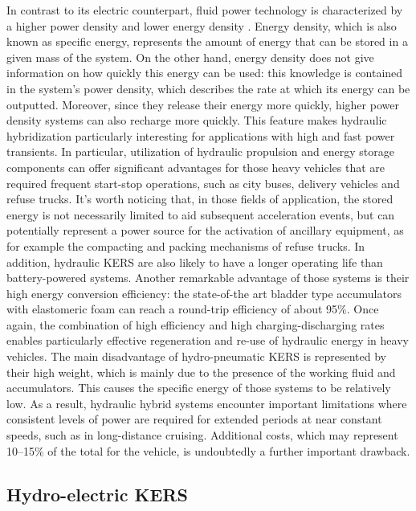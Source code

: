 \documentclass[11pt]{article}
\begin{document}
In contrast to its electric counterpart, fluid power technology is characterized by a higher power density and lower energy density \cite{f}. Energy density, which is also known as specific energy, represents the amount of energy that can be stored in a given mass of the system. On the other hand, energy density does not give information on how quickly this energy can be used: this knowledge is contained in the system's power density, which describes the rate at which its energy can be outputted. Moreover, since they release their energy more quickly, higher power density systems can also recharge more quickly. This feature makes hydraulic hybridization particularly interesting for applications with high and fast power transients.  In particular, utilization of hydraulic propulsion and energy storage components can offer significant advantages for those heavy vehicles that are required frequent start-stop operations, such as city buses, delivery vehicles and refuse trucks. It’s worth noticing that, in those fields of application, the stored energy is not necessarily limited to aid subsequent acceleration events, but can potentially represent a power source for the activation of ancillary equipment, as for example the compacting and packing mechanisms of refuse trucks. In addition, hydraulic KERS are also likely to have a longer operating life than battery-powered systems.  Another remarkable advantage of those systems is their high energy conversion efficiency: the state-of-the art bladder type accumulators with elastomeric foam can reach a round-trip efficiency of about 95\%. Once again, the combination of high efficiency and high charging-discharging rates enables particularly effective regeneration and re-use of hydraulic energy in heavy vehicles.
The main disadvantage of hydro-pneumatic KERS is represented by their high weight, which is mainly due to the presence of the working fluid and accumulators. This causes the specific energy of those systems to be relatively low. As a result, hydraulic hybrid systems encounter important limitations where consistent levels of power are required for extended periods at near constant speeds, such as in long-distance cruising.
Additional costs, which may represent 10–15\% of the total for the vehicle, is undoubtedly a further important drawback.

\subsection{Hydro-electric KERS}
\end{document}
